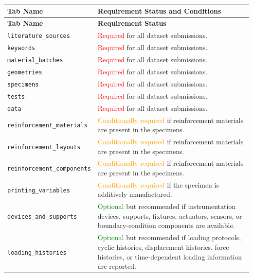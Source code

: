 \documentclass[11pt]{book}
\begin{document}
\begin{longtable}{p{}p{}}
\hline
\textbf{Tab Name} & \textbf{Requirement Status and Conditions} \\
\hline
\endfirsthead

\hline
\textbf{Tab Name} & \textbf{Requirement Status} \\
\hline
\endhead

\texttt{literature\_sources} &
\textcolor{red}{Required} for all dataset submissions.  \\

\texttt{keywords} &
\textcolor{red}{Required} for all dataset submissions.  \\

\texttt{material\_batches} &
\textcolor{red}{Required} for all dataset submissions. \\

\texttt{geometries} &
\textcolor{red}{Required} for all dataset submissions. \\

\texttt{specimens} &
\textcolor{red}{Required} for all dataset submissions. \\

\texttt{tests} &
\textcolor{red}{Required} for all dataset submissions. \\

\texttt{data} &
\textcolor{red}{Required} for all dataset submissions. \\

\texttt{reinforcement\_materials} &
\textcolor{orange}{Conditionally required} if reinforcement materials are present in the specimens. \\

\texttt{reinforcement\_layouts} &
\textcolor{orange}{Conditionally required} if reinforcement materials are present in the specimens. \\

\texttt{reinforcement\_components} &
\textcolor{orange}{Conditionally required} if reinforcement materials are present in the specimens. \\

\texttt{printing\_variables} &
\textcolor{orange}{Conditionally required} if the specimen is additively manufactured. \\

\texttt{devices\_and\_supports} &
\textcolor{green}{Optional} but recommended if instrumentation devices, supports, fixtures, actuators, sensors, or boundary-condition components are available. \\

\texttt{loading\_histories} &
\textcolor{green}{Optional} but recommended if loading protocols, cyclic histories, displacement histories, force histories, or time-dependent loading information are reported. \\

\hline
\end{longtable}
\end{document}

